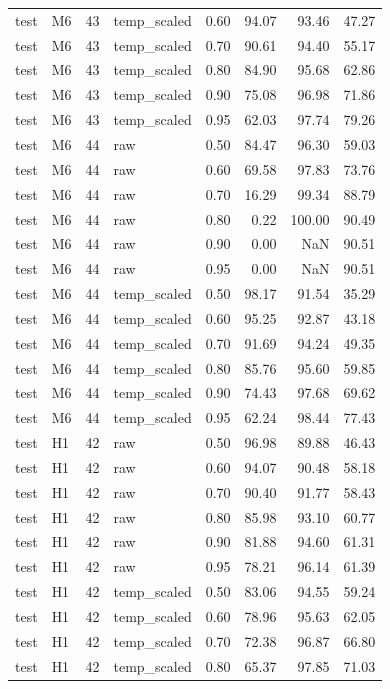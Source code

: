 \begin{tabular}{llrlrrrr}
test & M6 & 43 & temp\_scaled & 0.60 & 94.07 & 93.46 & 47.27 \\
test & M6 & 43 & temp\_scaled & 0.70 & 90.61 & 94.40 & 55.17 \\
test & M6 & 43 & temp\_scaled & 0.80 & 84.90 & 95.68 & 62.86 \\
test & M6 & 43 & temp\_scaled & 0.90 & 75.08 & 96.98 & 71.86 \\
test & M6 & 43 & temp\_scaled & 0.95 & 62.03 & 97.74 & 79.26 \\
test & M6 & 44 & raw & 0.50 & 84.47 & 96.30 & 59.03 \\
test & M6 & 44 & raw & 0.60 & 69.58 & 97.83 & 73.76 \\
test & M6 & 44 & raw & 0.70 & 16.29 & 99.34 & 88.79 \\
test & M6 & 44 & raw & 0.80 & 0.22 & 100.00 & 90.49 \\
test & M6 & 44 & raw & 0.90 & 0.00 & NaN & 90.51 \\
test & M6 & 44 & raw & 0.95 & 0.00 & NaN & 90.51 \\
test & M6 & 44 & temp\_scaled & 0.50 & 98.17 & 91.54 & 35.29 \\
test & M6 & 44 & temp\_scaled & 0.60 & 95.25 & 92.87 & 43.18 \\
test & M6 & 44 & temp\_scaled & 0.70 & 91.69 & 94.24 & 49.35 \\
test & M6 & 44 & temp\_scaled & 0.80 & 85.76 & 95.60 & 59.85 \\
test & M6 & 44 & temp\_scaled & 0.90 & 74.43 & 97.68 & 69.62 \\
test & M6 & 44 & temp\_scaled & 0.95 & 62.24 & 98.44 & 77.43 \\
test & H1 & 42 & raw & 0.50 & 96.98 & 89.88 & 46.43 \\
test & H1 & 42 & raw & 0.60 & 94.07 & 90.48 & 58.18 \\
test & H1 & 42 & raw & 0.70 & 90.40 & 91.77 & 58.43 \\
test & H1 & 42 & raw & 0.80 & 85.98 & 93.10 & 60.77 \\
test & H1 & 42 & raw & 0.90 & 81.88 & 94.60 & 61.31 \\
test & H1 & 42 & raw & 0.95 & 78.21 & 96.14 & 61.39 \\
test & H1 & 42 & temp\_scaled & 0.50 & 83.06 & 94.55 & 59.24 \\
test & H1 & 42 & temp\_scaled & 0.60 & 78.96 & 95.63 & 62.05 \\
test & H1 & 42 & temp\_scaled & 0.70 & 72.38 & 96.87 & 66.80 \\
test & H1 & 42 & temp\_scaled & 0.80 & 65.37 & 97.85 & 71.03 \\

\end{tabular}
